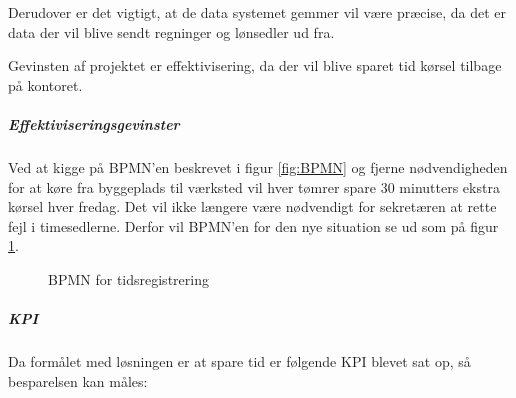Derudover er det vigtigt, at de data systemet gemmer vil være præcise, da det er data der vil blive sendt regninger og lønsedler ud fra.

Gevinsten af projektet er effektivisering, da der vil blive sparet tid kørsel tilbage på kontoret.

\subparagraph{Effektiviseringsgevinster}
Ved at kigge på BPMN'en beskrevet i figur \ref{fig:BPMN} og fjerne nødvendigheden for at køre fra byggeplads til værksted vil hver tømrer spare 30 minutters ekstra kørsel hver fredag. Det vil ikke længere være nødvendigt for sekretæren at rette fejl i timesedlerne. Derfor vil BPMN'en for den nye situation se ud som på figur \ref{fig:BPMN2}.

\begin{figure}
    \caption{BPMN for tidsregistrering}
    \label{fig:BPMN2}
\end{figure}

\subparagraph{KPI}
Da formålet med løsningen er at spare tid er følgende KPI blevet sat op, så besparelsen kan måles:

